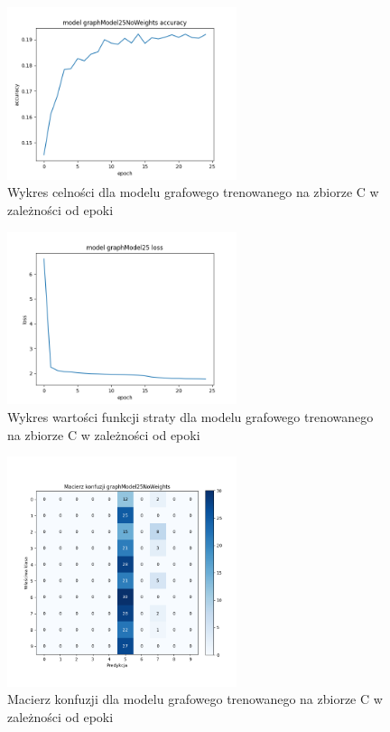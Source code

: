 \documentclass{article}
\begin{document}
\begin{figure}[H]
    \centering
    \includegraphics[width=0.6\textwidth]{img/graphModel25NoWeights_acc.png}
    \caption{Wykres celności dla modelu grafowego trenowanego na zbiorze C w zależności od epoki} 
\end{figure}

\begin{figure}[H]
    \centering
    \includegraphics[width=0.6\textwidth]{img/graphModel25_loss.png}
    \caption{Wykres wartości funkcji straty dla modelu grafowego trenowanego na zbiorze C w zależności od epoki} 
\end{figure}

\begin{figure}[H]
    \centering
    \includegraphics[width=0.6\textwidth]{img/graphModel25NoWeights_confusion.png}
    \caption{Macierz konfuzji dla modelu grafowego trenowanego na zbiorze C w zależności od epoki} 
\end{figure}
\end{document}
